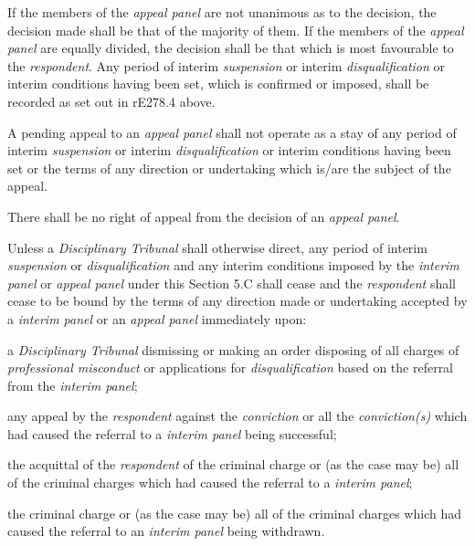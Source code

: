 If the members of the \emph{appeal panel} are not unanimous as to the
decision, the decision made shall be that of the majority of them. If
the members of the \emph{appeal panel} are equally divided, the decision
shall be that which is most favourable to the \emph{respondent}. Any
period of interim \emph{suspension} or
interim \emph{disqualification} or interim conditions having been set,
which is confirmed or imposed, shall be recorded as set out in rE278.4
above.
\par
A pending appeal to an \emph{appeal panel} shall not operate as a stay
of any period of interim \emph{suspension} or
interim \emph{disqualification} or interim conditions having been set or
the terms of any direction or undertaking which is/are the subject of
the appeal.\\
\par
There shall be no right of appeal from the decision of an \emph{appeal
panel}.\\
\par
{}
Unless a \emph{Disciplinary Tribunal} shall otherwise direct, any period
of interim \emph{suspension} or \emph{disqualification} and any interim
conditions imposed by the \emph{interim panel} or \emph{appeal
panel} under this Section 5.C shall cease and
the \emph{respondent} shall cease to be bound by the terms of any
direction made or undertaking accepted by a \emph{interim panel} or
an \emph{appeal panel} immediately upon:\\\nl \item a \emph{Disciplinary Tribunal} dismissing or making an order
disposing of all charges of \emph{professional misconduct} or
applications for \emph{disqualification} based on the referral from
the \emph{interim panel};\item any appeal by the \emph{respondent} against the \emph{conviction} or
all the \emph{conviction(s)} which had caused the referral to
a \emph{interim panel} being successful;\item the acquittal of the \emph{respondent} of the criminal charge or (as
the case may be) all of the criminal charges which had caused the
referral to a \emph{interim panel};\item the criminal charge or (as the case may be) all of the criminal
charges which had caused the referral to an \emph{interim panel} being
withdrawn.\ln
{}\par
